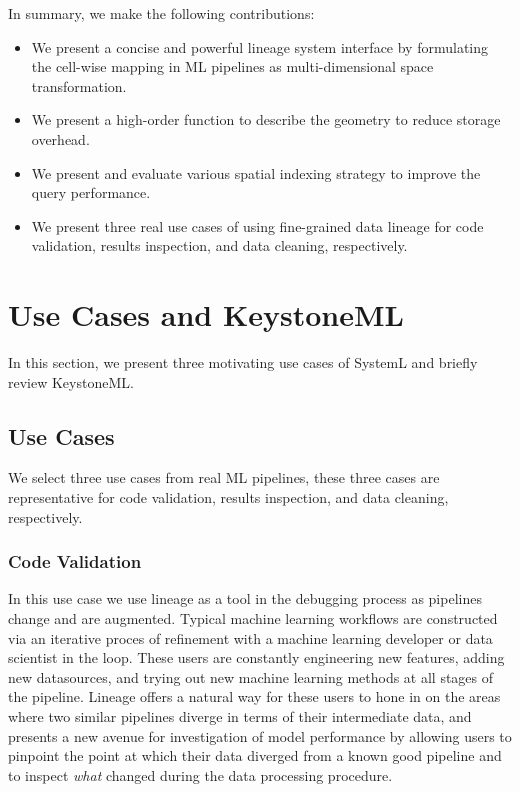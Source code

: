 \documentclass{sig-alternate}
\newenvironment{shortlist}{
        \vspace*{-0.5em}
  \begin{itemize}
  \setlength{\itemsep}{-0.1em}
}{
  \end{itemize}
        \vspace*{-0.5em}
}
\begin{document}
In summary, we make the following contributions:
\begin{shortlist}
\item{} We present a concise and powerful lineage system interface by formulating the cell-wise mapping in ML pipelines as multi-dimensional space transformation.
\item{} We present a high-order function to describe the geometry to reduce storage overhead.
\item{} We present and evaluate various spatial indexing strategy to improve the query performance.
\item{} We present three real use cases of using fine-grained data lineage for code validation, results inspection, and data cleaning, respectively.
\end{shortlist}


\section{Use Cases and KeystoneML}
\label{sec:Background}
In this section, we present three motivating use cases of SystemL and briefly review KeystoneML.

\subsection{Use Cases}
\label{sec:Back-cases}
We select three use cases from real ML pipelines, these three cases are representative for code validation, results inspection, and data cleaning, respectively.

\subsubsection{Code Validation}
In this use case we use lineage as a tool in the debugging process as pipelines change and are augmented. 
Typical machine learning workflows are constructed via an iterative proces of refinement with a machine learning developer or data scientist in the loop.
These users are constantly engineering new features, adding new datasources, and trying out new machine learning methods at all stages of the pipeline.
Lineage offers a natural way for these users to hone in on the areas where two similar pipelines diverge in terms of their intermediate data, and presents a new avenue for investigation of model performance by allowing users to pinpoint the point at which their data diverged from a known good pipeline and to inspect \emph{what} changed during the data processing procedure. 
\end{document}
